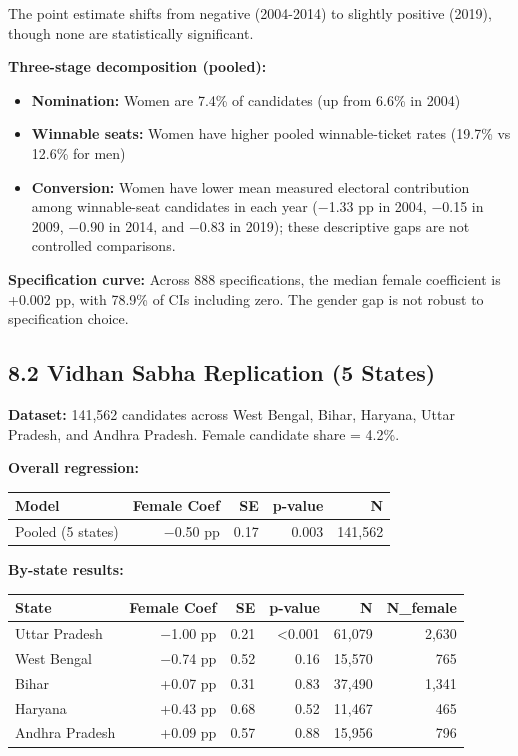 \documentclass[
]{article}
\newcounter{none} %
\providecommand{\tightlist}{%
  \setlength{\itemsep}{0pt}\setlength{\parskip}{0pt}}
\begin{document}
The point estimate shifts from negative (2004-2014) to slightly positive (2019), though none are statistically significant.

\textbf{Three-stage decomposition (pooled):}

\begin{itemize}
\tightlist
\item
  \textbf{Nomination:} Women are 7.4\% of candidates (up from 6.6\% in 2004)
\item
  \textbf{Winnable seats:} Women have higher pooled winnable-ticket rates (19.7\% vs 12.6\% for men)
\item
  \textbf{Conversion:} Women have lower mean measured electoral contribution among winnable-seat candidates in each year ($-$1.33 pp in 2004, $-$0.15 in 2009, $-$0.90 in 2014, and $-$0.83 in 2019); these descriptive gaps are not controlled comparisons.
\end{itemize}

\textbf{Specification curve:} Across 888 specifications, the median female coefficient is +0.002 pp, with 78.9\% of CIs including zero. The gender gap is not robust to specification choice.

\subsection{8.2 Vidhan Sabha Replication (5 States)}\label{82-vidhan-sabha-replication-5-states}

\textbf{Dataset:} 141,562 candidates across West Bengal, Bihar, Haryana, Uttar Pradesh, and Andhra Pradesh. Female candidate share = 4.2\%.

\textbf{Overall regression:}

{\def\LTcaptype{none} %
\begin{longtable}[]{@{}lrrrr@{}}
\toprule\noalign{}
Model & Female Coef & SE & p-value & N \\
\midrule\noalign{}
\endhead
\bottomrule\noalign{}
\endlastfoot
Pooled (5 states) & $-$0.50 pp & 0.17 & 0.003 & 141,562 \\
\end{longtable}
}

\textbf{By-state results:}

{\def\LTcaptype{none} %
\begin{longtable}[]{@{}lrrrrr@{}}
\toprule\noalign{}
State & Female Coef & SE & p-value & N & N\_female \\
\midrule\noalign{}
\endhead
\bottomrule\noalign{}
\endlastfoot
Uttar Pradesh & $-$1.00 pp & 0.21 & \textless0.001 & 61,079 & 2,630 \\
West Bengal & $-$0.74 pp & 0.52 & 0.16 & 15,570 & 765 \\
Bihar & +0.07 pp & 0.31 & 0.83 & 37,490 & 1,341 \\
Haryana & +0.43 pp & 0.68 & 0.52 & 11,467 & 465 \\
Andhra Pradesh & +0.09 pp & 0.57 & 0.88 & 15,956 & 796 \\
\end{longtable}
}
\end{document}
